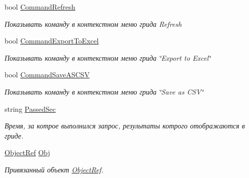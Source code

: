 \begin{DoxyCompactItemize}
bool \mbox{\hyperlink{class_f_b_a_1_1_data_grid_view_f_b_a_a75234def73e12829e812686d883a02f5}{Command\+Refresh}}
\begin{DoxyCompactList}\small\item\em Показывать команду в контекстном меню грида Refresh \end{DoxyCompactList}\item 
bool \mbox{\hyperlink{class_f_b_a_1_1_data_grid_view_f_b_a_a42be50368d13e55057c45b8585f991c6}{Command\+Export\+To\+Excel}}
\begin{DoxyCompactList}\small\item\em Показывать команду в контекстном меню грида \char`\"{}\+Export to Excel\char`\"{} \end{DoxyCompactList}\item 
bool \mbox{\hyperlink{class_f_b_a_1_1_data_grid_view_f_b_a_a8eb4e49c164e1ee516f05dc02d926135}{Command\+Save\+A\+S\+C\+SV}}
\begin{DoxyCompactList}\small\item\em Показывать команду в контекстном меню грида \char`\"{}\+Save as C\+S\+V\char`\"{} \end{DoxyCompactList}\item 
string \mbox{\hyperlink{class_f_b_a_1_1_data_grid_view_f_b_a_a16078c548f1c079144079398d00d88e9}{Passed\+Sec}}
\begin{DoxyCompactList}\small\item\em Время, за котрое выполнился запрос, результаты котрого отображаются в гриде. \end{DoxyCompactList}\item 
\mbox{\hyperlink{class_f_b_a_1_1_object_ref}{Object\+Ref}} \mbox{\hyperlink{class_f_b_a_1_1_data_grid_view_f_b_a_a247ecfe7c3e003c0e5d82b1f7acdb021}{Obj}}
\begin{DoxyCompactList}\small\item\em Привязанный объект \mbox{\hyperlink{class_f_b_a_1_1_object_ref}{Object\+Ref}}. \end{DoxyCompactList}\end{DoxyCompactItemize}


